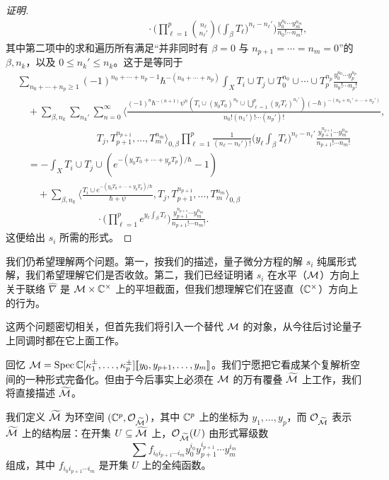 \begin{proof}[证明]
\begin{align*}
&\qquad\qquad\qquad\qquad\cdot\Big(\prod_{\ell=1}^p\binom{n_\ell}{n_\ell'}\Big(\int_\beta T_\ell\Big)^{n_\ell-n_\ell'}\Big)\frac{y_0^{n_0}\cdots y_m^{n_m}}{n_0!\cdots n_m!},
\end{align*}
其中第二项中的求和遍历所有满足“并非同时有 $\beta=0$ 与 $n_{p+1}=\cdots=n_m=0$”的 $\beta,n_k$，以及 $0\le n_k'\le n_k$。这于是等同于
\begin{align*}
&\sum_{n_0+\cdots+n_p\ge1}(-1)^{n_0+\cdots+n_p-1}\hbar^{-(n_0+\cdots+n_p)}\int_X T_i\cup T_j\cup T_0^{n_0}\cup\cdots\cup T_p^{n_p}\frac{y_0^{n_0}\cdots y_p^{n_p}}{n_0!\cdots n_p!}\\
&\quad+\sum_{\beta,n_k}\sum_{n_k'}\sum_{n=0}^{\infty}\Big\langle\frac{(-1)^n\hbar^{-(n+1)}\psi^n(T_i\cup(y_0T_0)^{n_0}\cup\bigcup_{\ell=1}^p(y_\ell T_\ell)^{n_\ell'})(-\hbar)^{-(n_0+n_1'+\cdots+n_p')}}{n_0!(n_1')!\cdots(n_p')!},\\
&\qquad\qquad\qquad\qquad T_j,T_{p+1}^{n_{p+1}},\dots,T_m^{n_m}\Big\rangle_{0,\beta}\prod_{\ell=1}^p\frac{1}{(n_\ell-n_\ell')!}\Big(y_\ell\int_\beta T_\ell\Big)^{n_\ell-n_\ell'}\frac{y_{p+1}^{n_{p+1}}\cdots y_m^{n_m}}{n_{p+1}!\cdots n_m!}\\
&\quad=-\int_X T_i\cup T_j\cup(e^{-(y_0T_0+\cdots+y_pT_p)/\hbar}-1)\\
&\quad\quad+\sum_{\beta,n_k}\Big\langle\frac{T_i\cup e^{-(y_0T_0+\cdots+y_pT_p)/\hbar}}{\hbar+\psi},T_j,T_{p+1}^{n_{p+1}},\dots,T_m^{n_m}\Big\rangle_{0,\beta}\\
&\qquad\qquad\qquad\qquad\cdot\Big(\prod_{\ell=1}^p e^{y_\ell\int_\beta T_\ell}\Big)\frac{y_{p+1}^{n_{p+1}}\cdots y_m^{n_m}}{n_{p+1}!\cdots n_m!}.
\end{align*}
这便给出 $s_i$ 所需的形式。
\end{proof}

我们仍希望理解两个问题。第一，按我们的描述，量子微分方程的解 $s_i$ 纯属形式解，我们希望理解它们是否收敛。第二，我们已经证明诸 $s_i$ 在水平（$\mathcal{M}$）方向上关于联络 $\widehat{\nabla}$ 是 $\mathcal{M}\times\mathbb{C}^\times$ 上的平坦截面，但我们想理解它们在竖直（$\mathbb{C}^\times$）方向上的行为。

这两个问题密切相关，但首先我们将引入一个替代 $\mathcal{M}$ 的对象，从今往后讨论量子上同调时都在它上面工作。

回忆 $\mathcal{M}=\mathrm{Spec}\,\mathbb{C}[\kappa_1^{\pm},\dots,\kappa_p^{\pm}][\![y_0,y_{p+1},\dots,y_m]\!]$。我们宁愿把它看成某个复解析空间的一种形式完备化。但由于今后事实上必须在 $\mathcal{M}$ 的万有覆叠 $\widetilde{\mathcal{M}}$ 上工作，我们将直接描述 $\widetilde{\mathcal{M}}$。

\begin{definition}
我们定义 $\widetilde{\mathcal{M}}$ 为环空间 $(\mathbb{C}^p,\mathcal{O}_{\widetilde{\mathcal{M}}})$，其中 $\mathbb{C}^p$ 上的坐标为 $y_1,\dots,y_p$，而 $\mathcal{O}_{\widetilde{\mathcal{M}}}$ 表示 $\widetilde{\mathcal{M}}$ 上的结构层：在开集 $U\subseteq\widetilde{\mathcal{M}}$ 上，$\mathcal{O}_{\widetilde{\mathcal{M}}}(U)$ 由形式幂级数
\begin{equation}
\sum f_{i_0i_{p+1}\cdots i_m}y_0^{i_0}y_{p+1}^{i_{p+1}}\cdots y_m^{i_m} \tag{2.11}
\end{equation}
组成，其中 $f_{i_0i_{p+1}\cdots i_m}$ 是开集 $U$ 上的全纯函数。
\end{definition}


